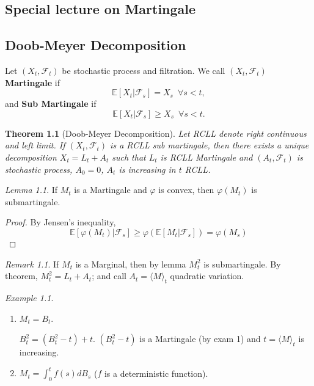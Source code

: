 \documentclass[12pt]{report}
\newcommand{\F}{\mathcal{F}}
\newcommand{\E}{\mathbb{E}}
\renewcommand{\1}{\mathbb{1}}
\theoremstyle{break}
\newtheorem{thm}{Theorem}[section] %
\theoremstyle{newdef}
\theoremstyle{remark}
\newtheorem*{exmp}{Example} %
\newtheorem*{lem}{Lemma}
\newtheorem*{rem}{Remark} %
\begin{document}
\begin{appendices}


\chapter{Special lecture on Martingale}

\section{Doob-Meyer Decomposition}

Let $(X_t, \F_t)$ be stochastic process and filtration.
We call $(X_t, \F_t)$ \textbf{Martingale} if
\[\E[X_t|\F_s] = X_s \enspace \forall s < t,\]
and \textbf{Sub Martingale} if
\[\E[X_t|\F_s] \geq X_s \enspace \forall s < t.\]

\begin{thm}[Doob-Meyer Decomposition]
Let RCLL denote right continuous and left limit.
If $(X_t, \F_t)$ is a RCLL sub martingale, then
there exists a unique decomposition $X_t = L_t + A_t$ such that
$L_t$ is RCLL Martingale and $(A_t, \F_t)$ is stochastic process, $A_0 = 0$, $A_t$ is increasing in $t$ RCLL.
\end{thm}

\begin{lem}
If $M_t$ is a Martingale and $\varphi$ is convex, then $\varphi(M_t)$ is submartingale.
\begin{proof}
By Jensen's inequality,
\[\E[\varphi(M_t)|\F_s] \geq \varphi(\E[M_t|\F_s])=\varphi(M_s)\]
\end{proof}
\end{lem}

\begin{rem}
If $M_t$ is a Marginal, then by lemma $M_t^2$ is submartingale.
By theorem, $M_t^2 = L_t + A_t$; and call $A_t = \langle M\rangle_t$ quadratic variation.
\end{rem}


\begin{exmp}
\leavevmode
\begin{enumerate}
\item $M_t = B_t$.

$B_t^2 = (B_t^2-t) + t$.
$(B_t^2 - t)$ is a Martingale (by exam 1) and $t = \langle M \rangle_t$ is increasing. 

\item $M_t = \int_0^t f(s)dB_s$ ($f$ is a deterministic function).


\end{enumerate}
\end{exmp}
\end{appendices}
\end{document}
